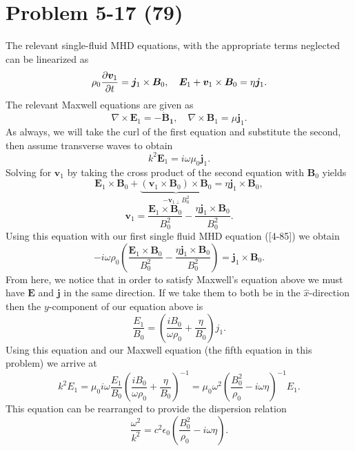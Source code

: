 \section*{Problem 5-17 (79)}
\label{sec:5-17}
The relevant single-fluid MHD equations, with the appropriate terms neglected can be linearized as
\begin{equation*}
	\rho_0\frac{\partial \bm{v}_1}{\partial t} = \bm{j}_1 \times \bm{B}_0, \quad \bm{E}_1 + \bm{v}_1 \times \bm{B}_0 = \eta\bm{j}_1.
\end{equation*}
The relevant Maxwell equations are given as
\begin{equation*}
	\nabla \times \bm{E}_1 = -\bm{\dot{B}_1}, \quad \nabla \times \bm{B}_1 = \mu\bm{j}_1.
\end{equation*}
As always, we will take the curl of the first equation and substitute the second, then assume transverse waves to obtain
\begin{equation*}
	k^2\bm{E}_1 = i\omega \mu_0 \bm{j}_1.
\end{equation*}
Solving for \(\bm{v}_{1} \) by taking the cross product of the second equation with \(\bm{B}_0\) yields
\begin{equation*}
	\bm{E}_1\times\bm{B}_0 + \underbrace{(\bm{v}_1 \times \bm{B}_0)\times \bm{B}_0}_{-\bm{v}_{1\perp}B_0^2} = \eta\bm{j}_1\times\bm{B}_0,
\end{equation*}
\begin{equation*}
	 \bm{v}_1 = \dfrac{\bm{E}_1\times\bm{B}_0}{B_0^2} - \dfrac{\eta\bm{j}_1\times\bm{B}_0}{B_0^2}.
\end{equation*}
Using this equation with our first single fluid MHD equation ([4-85]) we obtain
\begin{equation*}
	-i\omega\rho_0\left(\dfrac{\bm{E}_1\times\bm{B}_0}{B_0^2} - \dfrac{\eta\bm{j}_1\times\bm{B}_0}{B_0^2} \right) = \bm{j}_1 \times \bm{B}_0.
\end{equation*}
From here, we notice that in order to satisfy Maxwell's equation above we must have \(\bm{E}\) and \(\bm{j}\) in the same direction. If we take them to both be in the \(\hat{x}\)-direction then the \(y\)-component of our equation above is
\begin{equation*}
	\dfrac{E_1}{B_0} = \left(\dfrac{iB_0}{\omega\rho_0} + \dfrac{\eta}{B_0}\right)j_1.
\end{equation*}
Using this equation and our Maxwell equation (the fifth equation in this problem) we arrive at
\begin{equation*}
	k^2E_1 = \mu_0i\omega\dfrac{E_1}{B_0}\left(\dfrac{iB_0}{\omega \rho_0} + \dfrac{\eta}{B_0}\right)^{-1} = \mu_0\omega^2\left(\dfrac{B_0^2}{\rho_0} - i\omega\eta \right)^{-1}E_1.
\end{equation*}
This equation can be rearranged to provide the dispersion relation
\begin{equation*}
	\dfrac{\omega^2}{k^2}  = c^2\epsilon_0\left(\dfrac{B_0^2}{\rho_0} - i\omega\eta \right).
\end{equation*}

